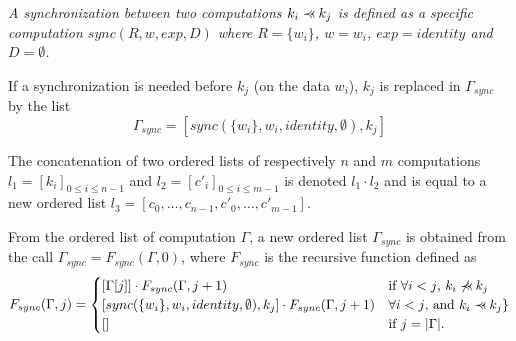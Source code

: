 \begin{mydef}
\textit{A synchronization between two computations $k_i \pprec k_j$ is defined as a specific computation $sync(R,w,exp,D)$ where $R=\{w_i\}$, $w=w_i$, $exp=identity$ and $D=\emptyset$.}
\end{mydef}

\begin{mydef}
If a synchronization is needed before $k_j$ (on the data $w_i$), $k_j$ is replaced in $\Gamma_{sync}$ by the list
\begin{equation*}
\Gamma_{sync} = [sync(\{w_i\},w_i,identity,\emptyset), k_j]
\end{equation*}
\end{mydef}

\begin{mydef}
The concatenation of two ordered lists of respectively $n$ and $m$ computations $l_1=[k_i]_{0 \leq i \leq n-1}$ and $l_2=[c'_i]_{0 \leq i \leq m-1}$ is denoted $l_1 \cdot l_2$ and is equal to a new ordered list $l_3=[c_0,\dots,c_{n-1},c'_0,\dots,c'_{m-1}]$.
\end{mydef}

\begin{mydef}
From the ordered list of computation $\Gamma$, a new ordered list $\Gamma_{sync}$ is obtained from the call $\Gamma_{sync} = F_{sync}(\Gamma,0)$, where $F_{sync}$ is the recursive function defined as
\begin{equation*}
F_{sync}(\Gamma,j) = 
\begin{cases} 	[\Gamma[j]] \cdot F_{sync}(\Gamma,j+1) & \mbox{if }\forall i<j \mbox{, } k_i \not\pprec k_j\\
				[sync(\{w_i\},w_i,identity,\emptyset), k_j] \cdot F_{sync}(\Gamma,j+1) & \forall i<j \text{, and }k_i \pprec k_j\}\\
				[] & \mbox{if }j=|\Gamma|.
\end{cases}
\end{equation*}
\end{mydef}


